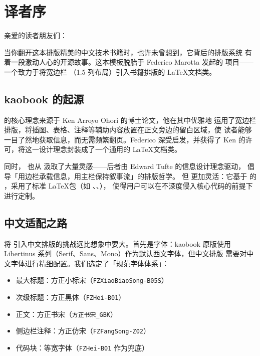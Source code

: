 \chapter*{译者序}

亲爱的读者朋友们：

当你翻开这本排版精美的中文技术书籍时，也许未曾想到，它背后的排版系统
\index{\LaTeX}有着一段激动人心的开源故事。这本模板脱胎于 Federico Marotta
发起的  项目——一个致力于将宽边栏
（1.5 列布局）引入书籍排版的 \LaTeX 文档类。

\section*{kaobook 的起源}

 的核心理念来源于 Ken Arroyo Ohori 的博士论文\cite{ohori2016}，他在其中优雅地
运用了宽边栏排版，将插图、表格、注释等辅助内容放置在正文旁边的留白区域，使
读者能够一目了然地获取信息，而无需频繁翻页。Federico 深受启发，并获得了 Ken
的许可，将这一设计理念封装成了一个通用的 \LaTeX 文档类。


同时， 也从 
汲取了大量灵感——后者由 Edward Tufte 的信息设计理念驱动，
倡导「用边栏承载信息，用主栏保持叙事流」的排版哲学\cite{tufte2001}。
但  更加灵活：它基于 \KOMAScript 的 ，采用了标准
\LaTeX 包（如 、、），
使得用户可以在不深度侵入核心代码的前提下进行定制。

\section*{中文适配之路}

将  引入中文排版的挑战远比想象中要大。首先是字体：kaobook
原版使用 Libertinus 系列（Serif、Sans、Mono）作为默认西文字体，但中文排版
需要对中文字体进行精细配置。我们选定了「规范字体体系」：
\begin{itemize}
    \item 最大标题：方正小标宋（\texttt{FZXiaoBiaoSong-B05S}）
    \item 次级标题：方正黑体（\texttt{FZHei-B01}）
    \item 正文：方正书宋（\texttt{方正书宋\_GBK}）
    \item 侧边栏注释：方正仿宋（\texttt{FZFangSong-Z02}）
    \item 代码块：等宽字体（\texttt{FZHei-B01} 作为兜底）
\end{itemize}

